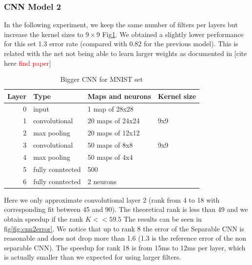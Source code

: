 \subsubsection{CNN Model 2}
In the following experiment, we keep the same number of filters per layers but increase the
kernel sizes to $9\times9$ Fig\ref{fig:CNN2}. We obtained a slightly lower performance for this set 1.3 error rate (compared with 0.82 for the previous model). This is related with the net not being able to learn larger weights as documented in [cite here \textcolor{red}{find paper}]

\begin{table}
\centering
\begin{tabular}{@{}rlll@{}}\toprule
Layer & Type & Maps and neurons& Kernel size \\ \midrule
0 & input & 1 map of 28x28 &\\
1& convolutional & 20 maps of 24x24 & 9x9\\
2 & max pooling & 20 maps of 12x12 &  \\
3 & convolutional & 50 maps of 8x8& 9x9 \\
4 & max pooling & 50 maps of 4x4&  \\ 
5 & fully conntected& 500 & \\
6 & fully conntected & 2 neurons & \\ \bottomrule
\end{tabular}
\caption{Bigger CNN for MNIST set}
\label{fig:CNN2}
\end{table}

Here we only approximate convolutional layer 2 (rank from 4 to 18 with corresponding fit between 45 and 90). The theoretical rank is less than 49 and we obtain speedup if the rank $K << 59.5$
The results can be seen in fig\ref{fig:cnn2error}. We notice that up to rank 8 the error of the Separable CNN is reasonable and does not drop more than 1.6 (1.3 is the reference error of the non separable CNN). The speedup for rank 18 is from 15ms to 12ms per layer, which is actually smaller than we expected for using larger filters.

